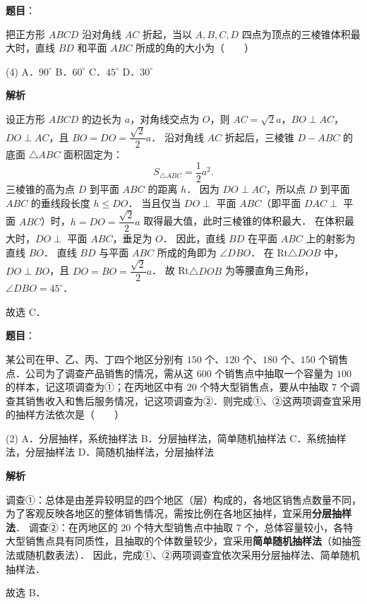 \begin{answer}

\textbf{题目}：

把正方形 $ABCD$ 沿对角线 $AC$ 折起，当以 $A, B, C, D$ 四点为顶点的三棱锥体积最大时，直线 $BD$ 和平面 $ABC$ 所成的角的大小为\mbox{（　　）}

\begin{gkopts}(4)
\task A．$90^\circ$
\task B．$60^\circ$
\task C．$45^\circ$
\task D．$30^\circ$
\end{gkopts}

\textbf{解析}

设正方形 $ABCD$ 的边长为 $a$，对角线交点为 $O$，则 $AC = \sqrt{2}a$，$BO \perp AC$，$DO \perp AC$，且 $BO = DO = \dfrac{\sqrt{2}}{2}a$．
沿对角线 $AC$ 折起后，三棱锥 $D - ABC$ 的底面 $\triangle ABC$ 面积固定为：
\nopagebreak[4]
\[
S_{\triangle ABC} = \frac{1}{2} a^2.
\]
三棱锥的高为点 $D$ 到平面 $ABC$ 的距离 $h$．
因为 $DO \perp AC$，所以点 $D$ 到平面 $ABC$ 的垂线段长度 $h \leqslant DO$．
当且仅当 $DO \perp$ 平面 $ABC$（即平面 $DAC \perp$ 平面 $ABC$）时，$h = DO = \dfrac{\sqrt{2}}{2}a$ 取得最大值，此时三棱锥的体积最大．
在体积最大时，$DO \perp$ 平面 $ABC$，垂足为 $O$．
因此，直线 $BD$ 在平面 $ABC$ 上的射影为直线 $BO$．
直线 $BD$ 与平面 $ABC$ 所成的角即为 $\angle DBO$．
在 Rt$\triangle DOB$ 中，$DO \perp BO$，且 $DO = BO = \dfrac{\sqrt{2}}{2}a$．
故 Rt$\triangle DOB$ 为等腰直角三角形，$\angle DBO = 45^\circ$．

故选 C．


\end{answer}
\begin{answer}

\textbf{题目}：

某公司在甲、乙、丙、丁四个地区分别有 $150$ 个、$120$ 个、$180$ 个、$150$ 个销售点．公司为了调查产品销售的情况，需从这 $600$ 个销售点中抽取一个容量为 $100$ 的样本，记这项调查为①；在丙地区中有 $20$ 个特大型销售点，要从中抽取 $7$ 个调查其销售收入和售后服务情况，记这项调查为②．则完成①、②这两项调查宜采用的抽样方法依次是\mbox{（　　）}

\begin{gkopts}(2)
\task A．分层抽样，系统抽样法
\task B．分层抽样法，简单随机抽样法
\task C．系统抽样法，分层抽样法
\task D．简随机抽样法，分层抽样法
\end{gkopts}

\textbf{解析}

调查①：总体是由差异较明显的四个地区（层）构成的，各地区销售点数量不同，为了客观反映各地区的整体销售情况，需按比例在各地区抽样，宜采用\textbf{分层抽样法}．
调查②：在丙地区的 $20$ 个特大型销售点中抽取 $7$ 个，总体容量较小，各特大型销售点具有同质性，且抽取的个体数量较少，宜采用\textbf{简单随机抽样法}（如抽签法或随机数表法）．
因此，完成①、②两项调查宜依次采用分层抽样法、简单随机抽样法．

故选 B．


\end{answer}
